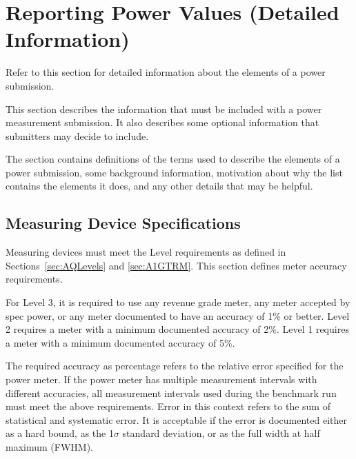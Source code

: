 \chapter{Reporting Power Values \normalsize{(Detailed Information)}}
\label{sec:reporting}

\noindent
Refer to this section for detailed information about the elements of a power submission. 
\wl

\noindent
This section describes the information that must be included with a power measurement submission. It also describes some optional information that submitters may decide to include.
\wl

\noindent
The section contains definitions of the terms used to describe the elements of a power submission, some background information, motivation about why the list contains the elements it does, and any other details that may be helpful.
\noindent


\section{Measuring Device Specifications}
\label{sec:MDSpecs}
\noindent
Measuring devices must meet the Level requirements as defined in 
Sections~\ref{sec:AQLevels} and \ref{sec:A1GTRM}. This section defines meter accuracy requirements.
\wl

\noindent
For Level 3, it is required to use any revenue grade meter, any meter accepted by spec power, or any meter documented to have an accuracy of 1\% or better. 
Level 2 requires a meter with a minimum documented accuracy of 2\%.
Level 1 requires a meter with a minimum documented accuracy of 5\%.
\wl

\noindent
The required accuracy as percentage refers to the relative error specified for the power meter.
If the power meter has multiple measurement intervals with different accuracies, all measurement intervals used during the benchmark run must meet the above requirements.
Error in this context refers to the sum of statistical and systematic error.
It is acceptable if the error is documented either as a hard bound, as the 1$\sigma$ standard deviation, or as the full width at half maximum (FWHM).
\wl

